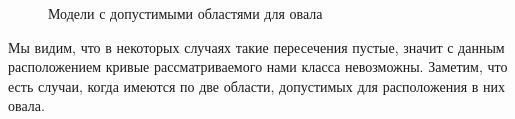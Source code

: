 \documentclass[11pt]{book}
\numberwithin{exercise}{chapter}
\begin{document}
\begin{figure}[H]
\caption{Модели с допустимыми областями для овала}
\label{fig:curves_with_ovals}
\end{figure}

Мы видим, что в некоторых случаях такие пересечения пустые, значит с данным расположением кривые рассматриваемого нами класса невозможны.
Заметим, что есть случаи, когда имеются по две области, допустимых для расположения в них овала.







\makeatother
\end{document}
